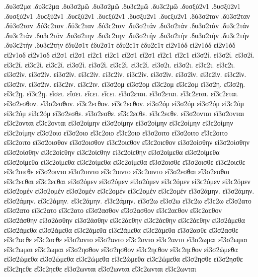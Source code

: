 {.δυ3σ2μα .δυ3ϲ2μα 
.δυ3σ2μῶ .δυ3σ2μῶ .δυ3ϲ2μῶ .δυ3ϲ2μῶ 
.δυσξύ2ν1 .δυσξύ2ν1 .δυσξύ2ν1 .δυϲξύ2ν1 .δυϲξύ2ν1 .δυϲξύ2ν1   %
.δυσξυ2ν1 .δυϲξυ2ν1 
.δύ3σ2ταν .δύ3σ2ταν .δύ3σ2ταν .δύ3ϲ2ταν .δύ3ϲ2ταν .δύ3ϲ2ταν   %
.δυ3σ2τάν .δυ3σ2τάν .δυ3σ2τάν .δυ3ϲ2τάν .δυ3ϲ2τάν .δυ3ϲ2τάν 
.δυ3σ2την .δυ3ϲ2την   %
.δυ3σ2τήν .δυ3σ2τήν .δυ3σ2τήν .δυ3ϲ2τήν .δυ3ϲ2τήν .δυ3ϲ2τήν 
ἐδυ2σ1τ ἐδυ2σ1τ ἐδυ2ϲ1τ ἐδυ2ϲ1τ   %
εἰ2ν1όδ εἰ2ν1όδ εἰ2ν1όδ   %
εἰ2ν1οδ εἰ2ν1οδ 
εἰ2σ1 εἰ2σ1 εἰ2ϲ1 εἰ2ϲ1   %
εἴ2σ1 εἴ2σ1 εἴ2ϲ1 εἴ2ϲ1 
εἰ3σ2ί. εἰ3σ2ί. εἰ3σ2ί. εἰ3ϲ2ί. εἰ3ϲ2ί. εἰ3ϲ2ί.   %
εἰ3σ2ὶ. εἰ3σ2ὶ. εἰ3ϲ2ὶ. εἰ3ϲ2ὶ. 
εἰ3σ2ι. εἰ3σ2ι. εἰ3ϲ2ι. εἰ3ϲ2ι. 
εἰ3σ2ίν. εἰ3σ2ίν. εἰ3σ2ίν. εἰ3ϲ2ίν. εἰ3ϲ2ίν. εἰ3ϲ2ίν. 
εἰ3σ2ὶν. εἰ3σ2ὶν. εἰ3ϲ2ὶν. εἰ3ϲ2ὶν. 
εἰ3σ2ιν. εἰ3σ2ιν. εἰ3ϲ2ιν. εἰ3ϲ2ιν. 
εἴ3σ2ομ εἴ3σ2ομ εἴ3ϲ2ομ εἴ3ϲ2ομ   %
εἴ3σ2ῃ. εἴ3σ2ῃ. εἴ3ϲ2ῃ. εἴ3ϲ2ῃ. εἴσει. εἴσει. εἴϲει. εἴϲει. 
εἴ3σ2εται. εἴ3σ2εται. εἴ3ϲ2εται. εἴ3ϲ2εται. 
εἴ3σ2εσθον. εἴ3σ2εσθον. εἴ3ϲ2εϲθον. εἴ3ϲ2εϲθον. 
εἰ3σ2όμ εἰ3σ2όμ εἰ3σ2όμ εἰ3ϲ2όμ εἰ3ϲ2όμ εἰ3ϲ2όμ   %
εἴ3σ2εσθε. εἴ3σ2εσθε. εἴ3ϲ2εϲθε. εἴ3ϲ2εϲθε. 
εἴ3σ2ονται εἴ3σ2ονται εἴ3ϲ2ονται εἴ3ϲ2ονται 
%
εἰ3σ2οίμην εἰ3σ2οίμην εἰ3σ2οίμην εἰ3ϲ2οίμην εἰ3ϲ2οίμην εἰ3ϲ2οίμην 
εἴ3σ2οιο εἴ3σ2οιο εἴ3ϲ2οιο εἴ3ϲ2οιο 
εἴ3σ2οιτο εἴ3σ2οιτο εἴ3ϲ2οιτο εἴ3ϲ2οιτο 
εἴ3σ2οισθον εἴ3σ2οισθον εἴ3ϲ2οιϲθον εἴ3ϲ2οιϲθον 
εἰ3σ2οίσθην εἰ3σ2οίσθην εἰ3σ2οίσθην εἰ3ϲ2οίϲθην εἰ3ϲ2οίϲθην εἰ3ϲ2οίϲθην 
εἰ3σ2οίμεθα εἰ3σ2οίμεθα εἰ3σ2οίμεθα εἰ3ϲ2οίμεθα εἰ3ϲ2οίμεθα εἰ3ϲ2οίμεθα 
εἴ3σ2οισθε εἴ3σ2οισθε εἴ3ϲ2οιϲθε εἴ3ϲ2οιϲθε 
εἴ3σ2οιντο εἴ3σ2οιντο εἴ3ϲ2οιντο εἴ3ϲ2οιντο 
%
εἴ3σ2εσθαι εἴ3σ2εσθαι εἴ3ϲ2εϲθαι εἴ3ϲ2εϲθαι 
εἰ3σ2όμεν εἰ3σ2όμεν εἰ3σ2όμεν εἰ3ϲ2όμεν εἰ3ϲ2όμεν εἰ3ϲ2όμεν   %
εἰ3σ2ομέν εἰ3σ2ομέν εἰ3σ2ομέν εἰ3ϲ2ομέν εἰ3ϲ2ομέν εἰ3ϲ2ομέν 
%
εἴ3σ2άμην. εἴ3σ2άμην. εἴ3σ2άμην. εἴ3ϲ2άμην. εἴ3ϲ2άμην. εἴ3ϲ2άμην. 
εἴ3σ2ω εἴ3σ2ω εἴ3ϲ2ω εἴ3ϲ2ω 
εἴ3σ2ατο εἴ3σ2ατο εἴ3ϲ2ατο εἴ3ϲ2ατο 
εἴ3σ2ασθον εἴ3σ2ασθον εἴ3ϲ2αϲθον εἴ3ϲ2αϲθον 
εἰ3σ2άσθην εἰ3σ2άσθην εἰ3σ2άσθην εἰ3ϲ2άϲθην εἰ3ϲ2άϲθην εἰ3ϲ2άϲθην 
εἰ3σ2άμεθα εἰ3σ2άμεθα εἰ3σ2άμεθα εἰ3ϲ2άμεθα εἰ3ϲ2άμεθα εἰ3ϲ2άμεθα 
εἴ3σ2ασθε εἴ3σ2ασθε εἴ3ϲ2αϲθε εἴ3ϲ2αϲθε 
εἴ3σ2αντο εἴ3σ2αντο εἴ3ϲ2αντο εἴ3ϲ2αντο 
%
εἴ3σ2ωμαι εἴ3σ2ωμαι εἴ3ϲ2ωμαι εἴ3ϲ2ωμαι 
εἴ3σ2ησθον εἴ3σ2ησθον εἴ3ϲ2ηϲθον εἴ3ϲ2ηϲθον 
εἰ3σ2ώμεθα εἰ3σ2ώμεθα εἰ3σ2ώμεθα εἰ3ϲ2ώμεθα εἰ3ϲ2ώμεθα εἰ3ϲ2ώμεθα 
εἴ3σ2ησθε εἴ3σ2ησθε εἴ3ϲ2ηϲθε εἴ3ϲ2ηϲθε 
εἴ3σ2ωνται εἴ3σ2ωνται εἴ3ϲ2ωνται εἴ3ϲ2ωνται 
}
